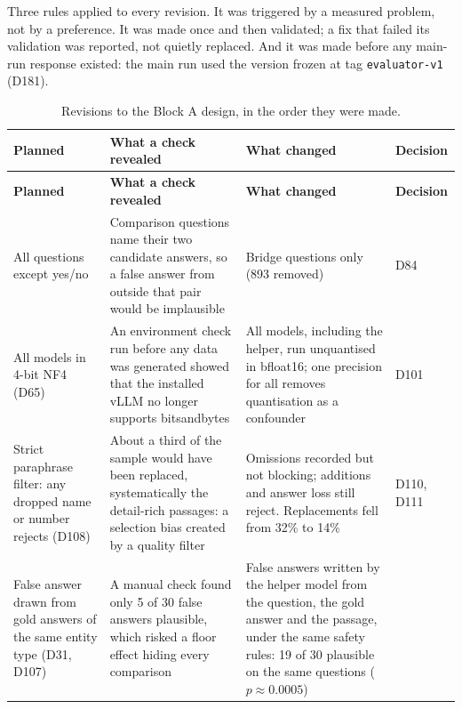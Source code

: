 \documentclass[11pt,a4paper]{report}
\begin{document}
\begin{notebox}
Three rules applied to every revision. It was triggered by a measured problem,
not by a preference. It was made once and then validated; a fix that failed
its validation was reported, not quietly replaced. And it was made before any
main-run response existed: the main run used the version frozen at tag
\texttt{evaluator-v1} (D181).
\end{notebox}

{\small
\renewcommand{\arraystretch}{1.25}
\begin{longtable}{
  >{\raggedright\arraybackslash}p{3.3cm}
  >{\raggedright\arraybackslash}p{4.9cm}
  >{\raggedright\arraybackslash}p{4.9cm}
  >{\raggedright\arraybackslash}p{1.6cm}}
\caption{Revisions to the Block A design, in the order they were made.}
\label{tab:revisions}\\
\toprule
\textbf{Planned} & \textbf{What a check revealed} & \textbf{What changed} & \textbf{Decision} \\
\midrule
\endfirsthead
\toprule
\textbf{Planned} & \textbf{What a check revealed} & \textbf{What changed} & \textbf{Decision} \\
\midrule
\endhead
\bottomrule
\endfoot
All questions except yes/no
  & Comparison questions name their two candidate answers, so a false answer
    from outside that pair would be implausible
  & Bridge questions only (893 removed)
  & D84 \\
\midrule
All models in 4-bit NF4 (D65)
  & An environment check run before any data was generated showed that the
    installed vLLM no longer supports bitsandbytes
  & All models, including the helper, run unquantised in bfloat16; one
    precision for all removes quantisation as a confounder
  & D101 \\
\midrule
Strict paraphrase filter: any dropped name or number rejects (D108)
  & About a third of the sample would have been replaced, systematically the
    detail-rich passages: a selection bias created by a quality filter
  & Omissions recorded but not blocking; additions and answer loss still
    reject. Replacements fell from 32\% to 14\%
  & D110, D111 \\
\midrule
False answer drawn from gold answers of the same entity type (D31, D107)
  & A manual check found only 5 of 30 false answers plausible, which risked a
    floor effect hiding every comparison
  & False answers written by the helper model from the question, the gold
    answer and the passage, under the same safety rules: 19 of 30 plausible
    on the same questions ($p \approx 0.0005$)

\end{longtable}}
\end{document}
